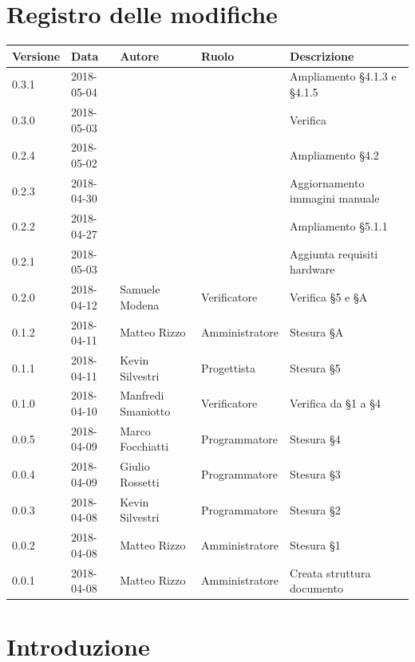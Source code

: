 \documentclass[openany,12pt,a4paper]{report}
\begin{document}
	\chapter*{Registro delle modifiche}
	\setlength\LTleft{-22mm}
	\begin{longtable}{|p{20mm}|p{20mm}|p{40mm}|p{30mm}|p{50mm}|}
		\hline
		\textbf{Versione} & \textbf{Data} & \textbf{Autore} & \textbf{Ruolo} & \textbf{Descrizione} \\

		\hline 0.3.1 & 2018-05-04 &  &  & Ampliamento §4.1.3 e §4.1.5\\
		\hline 0.3.0 & 2018-05-03 &  &  & Verifica\\		
		\hline 0.2.4 & 2018-05-02 &  &  & Ampliamento §4.2\\		
		\hline 0.2.3 & 2018-04-30 &  &  & Aggiornamento immagini manuale\\
		\hline 0.2.2 & 2018-04-27 &  &  & Ampliamento §5.1.1\\
		\hline 0.2.1 & 2018-05-03 &  &  & Aggiunta requisiti hardware \\		
		\hline 0.2.0 & 2018-04-12 & Samuele Modena & Verificatore & Verifica §5 e §A\\
		\hline 0.1.2 & 2018-04-11 & Matteo Rizzo & Amministratore & Stesura §A \\	
		\hline 0.1.1 & 2018-04-11 & Kevin Silvestri & Progettista & Stesura §5 \\
		\hline 0.1.0 & 2018-04-10 & Manfredi Smaniotto & Verificatore & Verifica da §1 a §4 \\
		\hline 0.0.5 & 2018-04-09 & Marco Focchiatti & Programmatore & Stesura §4 \\	
		\hline 0.0.4 & 2018-04-09 & Giulio Rossetti & Programmatore & Stesura §3 \\
		\hline 0.0.3 & 2018-04-08 & Kevin Silvestri & Programmatore & Stesura §2 \\
		\hline 0.0.2 & 2018-04-08 & Matteo Rizzo & Amministratore & Stesura §1 \\
		\hline 0.0.1 & 2018-04-08 & Matteo Rizzo & Amministratore & Creata struttura documento \\
		\hline
		
	\end{longtable}
	
	\tableofcontents
	
	
	\chapter{Introduzione}
	
\end{document}
